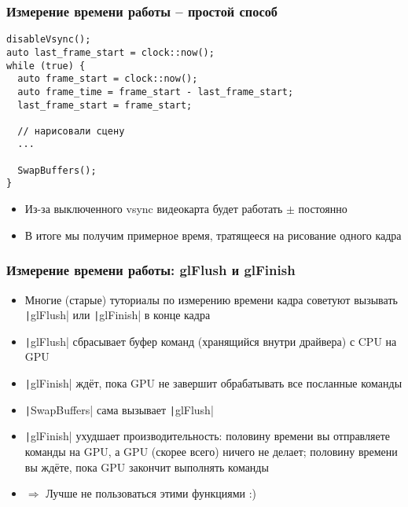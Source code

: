 \documentclass{beamer}
\begin{document}
\begin{frame}[fragile]
\frametitle{Измерение времени работы -- простой способ}
\begin{verbatim}
disableVsync();
auto last_frame_start = clock::now();
while (true) {
  auto frame_start = clock::now();
  auto frame_time = frame_start - last_frame_start;
  last_frame_start = frame_start;

  // нарисовали сцену
  ...

  SwapBuffers();
}
\end{verbatim}
\pause
\begin{itemize}
\item Из-за выключенного vsync видеокарта будет работать \begin{math}\pm\end{math} постоянно
\pause
\item В итоге мы получим примерное время, тратящееся на рисование одного кадра
\end{itemize}
\end{frame}

\begin{frame}[fragile]
\frametitle{Измерение времени работы: glFlush и glFinish}
\begin{itemize}
\item Многие (старые) туториалы по измерению времени кадра советуют вызывать \texttt|glFlush| или \texttt|glFinish| в конце кадра
\pause
\item \texttt|glFlush| сбрасывает буфер команд (хранящийся внутри драйвера) с CPU на GPU
\pause
\item \texttt|glFinish| ждёт, пока GPU не завершит обрабатывать все посланные команды
\pause
\item \texttt|SwapBuffers| сама вызывает \texttt|glFlush|
\pause
\item \texttt|glFinish| ухудшает производительность: половину времени вы отправляете команды на GPU, а GPU (скорее всего) ничего не делает; половину времени вы ждёте, пока GPU закончит выполнять команды
\pause
\item \begin{math}\Longrightarrow\end{math} Лучше не пользоваться этими функциями :)
\end{itemize}
\end{frame}
\end{document}
